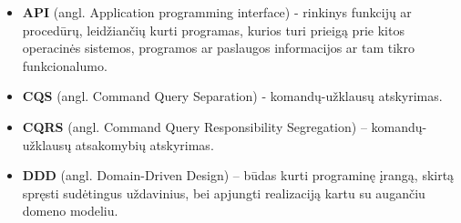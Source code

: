 \begin{itemize}

  \item \textbf{API} (angl. Application programming interface) - rinkinys funkcijų ar procedūrų, leidžiančių kurti programas, kurios turi prieigą prie kitos operacinės sistemos, programos ar paslaugos informacijos ar tam tikro funkcionalumo.

  \item \textbf{CQS} (angl. Command Query Separation) - komandų-užklausų atskyrimas.

  \item \textbf{CQRS} (angl. Command Query Responsibility Segregation) – komandų-užklausų atsakomybių atskyrimas.

  \item \textbf{DDD} (angl. Domain-Driven Design) – būdas kurti programinę įrangą, skirtą spręsti sudėtingus uždavinius, bei apjungti realizaciją kartu su augančiu domeno modeliu.

\end{itemize}
